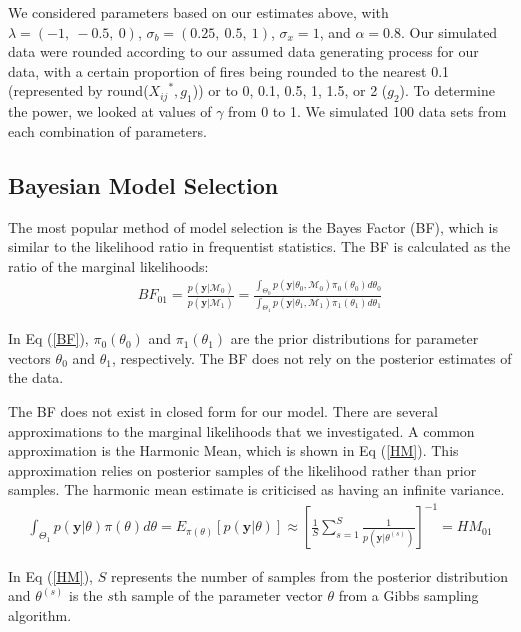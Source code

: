 \documentclass[10pt,letterpaper]{article}
\begin{document}
We considered parameters based on our estimates above, with
\(\lambda = (-1,~-0.5,~0)\), \(\sigma_b = (0.25,~0.5,~1)\),
\(\sigma_x = 1\), and \(\alpha = 0.8\). Our simulated data were rounded
according to our assumed data generating process for our data, with a certain proportion of fires being
rounded to the nearest 0.1 (represented by round(\({X_{ij}}^*, g_1\))) or
to 0, 0.1, 0.5, 1, 1.5, or 2 (\(g_2\)). To determine the power, we
looked at values of \(\gamma\) from 0 to 1. We simulated 100 data sets
from each combination of parameters.

\hypertarget{bayesian-model-selection}{%
\subsection{Bayesian Model Selection}\label{bayesian-model-selection}}

The most popular method of model selection is the Bayes Factor (BF),
which is similar to the likelihood ratio in frequentist statistics. The
BF is calculated as the ratio of the marginal likelihoods: \begin{align}
BF_{01} = \frac{p(\mathbf y | \mathcal{M}_0)}{p(\mathbf y | \mathcal{M}_1)} =
\frac{\int_{\Theta_0} p(\mathbf y | \theta_0, \mathcal{M} _0)\pi_0(\theta_0)d\theta_0}{\int_{\Theta_1} p(\mathbf y | \theta_1, \mathcal{M} _1)\pi_1(\theta_1)d\theta_1}
\label{BF}
\end{align}

In Eq (\ref{BF}), \(\pi_0(\theta_0)\) and \(\pi_1(\theta_1)\) are
the prior distributions for parameter vectors \(\theta_0\) and
\(\theta_1\), respectively. The BF does not rely on the posterior
estimates of the data.

The BF does not exist in closed form for our model. There are several
approximations to the marginal likelihoods that we investigated. A
common approximation is the Harmonic Mean, which is shown in Eq
(\ref{HM}). This approximation relies on posterior samples of the
likelihood rather than prior samples. The harmonic mean estimate is
criticised as having an infinite variance.
\begin{align}
\int_{\Theta_1} p(\mathbf y | \theta)\pi(\theta)d\theta = E_{\pi(\theta)}[p(\mathbf y | \theta)] \approx {\left[\frac{1}{S}\sum_{s = 1}^S\frac{1}{p(\mathbf y | \theta^{(s)})}\right]}^{-1} = HM_{01}
\label{HM}
\end{align}

In Eq (\ref{HM}), \(S\) represents the number of samples from the
posterior distribution and \(\theta^{(s)}\) is the \(s\)th sample of the
parameter vector \(\theta\) from a Gibbs sampling algorithm.
\end{document}
